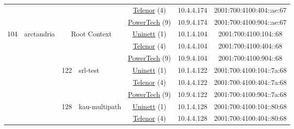 \begin{small}
\begin{center}
\begin{longtable}{|c|c|c|c|c|c|c|c|}
  &  &  &  & \multicolumn{2}{|c|}{\tiny{\href{https://www.telenor.no}{Telenor} (4)}} & \tiny{10.4.4.174} & \tiny{2001:700:4100:404::ae:67} \\* \cline{5-5}\cline{6-6}\cline{7-7}\cline{8-8}
  &  &  &  & \multicolumn{2}{|c|}{\tiny{\href{http://www.powertech.no}{PowerTech} (9)}} & \tiny{10.9.4.174} & \tiny{2001:700:4100:904::ae:67} \\ \hline
 \multirow{33}{*}{\tiny{104}} & \multicolumn{1}{|l|}{\multirow{33}{*}{\tiny{arctandria}}} & \multicolumn{2}{|c|}{\multirow{3}{*}{\tiny{Root Context}}} & \multicolumn{2}{|c|}{\tiny{\href{https://www.uninett.no}{Uninett} (1)}} & \tiny{10.1.4.104} & \tiny{2001:700:4100:104::68} \\* \cline{5-5}\cline{6-6}\cline{7-7}\cline{8-8}
  &  & \multicolumn{2}{|c|}{} & \multicolumn{2}{|c|}{\tiny{\href{https://www.telenor.no}{Telenor} (4)}} & \tiny{10.4.4.104} & \tiny{2001:700:4100:404::68} \\* \cline{5-5}\cline{6-6}\cline{7-7}\cline{8-8}
  &  & \multicolumn{2}{|c|}{} & \multicolumn{2}{|c|}{\tiny{\href{http://www.powertech.no}{PowerTech} (9)}} & \tiny{10.9.4.104} & \tiny{2001:700:4100:904::68} \\* \cline{3-3}\cline{4-4}\cline{5-5}\cline{6-6}\cline{7-7}\cline{8-8}
  &  & \multirow{3}{*}{\tiny{122}} & \multicolumn{1}{|l|}{\multirow{3}{*}{\tiny{srl-test}}} & \multicolumn{2}{|c|}{\tiny{\href{https://www.uninett.no}{Uninett} (1)}} & \tiny{10.1.4.122} & \tiny{2001:700:4100:104::7a:68} \\* \cline{5-5}\cline{6-6}\cline{7-7}\cline{8-8}
  &  &  &  & \multicolumn{2}{|c|}{\tiny{\href{https://www.telenor.no}{Telenor} (4)}} & \tiny{10.4.4.122} & \tiny{2001:700:4100:404::7a:68} \\* \cline{5-5}\cline{6-6}\cline{7-7}\cline{8-8}
  &  &  &  & \multicolumn{2}{|c|}{\tiny{\href{http://www.powertech.no}{PowerTech} (9)}} & \tiny{10.9.4.122} & \tiny{2001:700:4100:904::7a:68} \\* \cline{3-3}\cline{4-4}\cline{5-5}\cline{6-6}\cline{7-7}\cline{8-8}
  &  & \multirow{3}{*}{\tiny{128}} & \multicolumn{1}{|l|}{\multirow{3}{*}{\tiny{kau-multipath}}} & \multicolumn{2}{|c|}{\tiny{\href{https://www.uninett.no}{Uninett} (1)}} & \tiny{10.1.4.128} & \tiny{2001:700:4100:104::80:68} \\* \cline{5-5}\cline{6-6}\cline{7-7}\cline{8-8}
  &  &  &  & \multicolumn{2}{|c|}{\tiny{\href{https://www.telenor.no}{Telenor} (4)}} & \tiny{10.4.4.128} & \tiny{2001:700:4100:404::80:68} \\* \cline{5-5}\cline{6-6}\cline{7-7}\cline{8-8}

\end{longtable}
\end{center}
\end{small}
